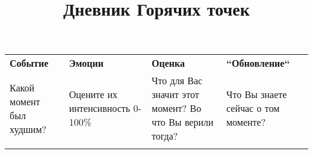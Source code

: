 \documentclass{../../shared/worksheet_landscape}
\title{Дневник Горячих точек}
\begin{document}
\begin{table}[]
\begin{center}
\renewcommand{\arraystretch}{1.4}

\begin{tabularx}{\textwidth}{|Y|Y|Y|Y|}

\hline
\textbf{Событие} & \textbf{Эмоции} & \textbf{Оценка} & \textbf{``Обновление``} \\
\small{Какой момент был худшим?} & \small{Оцените их интенсивность 0-100\%} & \small{Что для Вас значит этот момент? Во что Вы верили тогда?} & \small{Что Вы знаете сейчас о том моменте?} \\
\hline
& & & \\[425pt]
\hline
\end{tabularx}
\end{center}
\label{tab:activity_diary}
\end{table}
\end{document}
